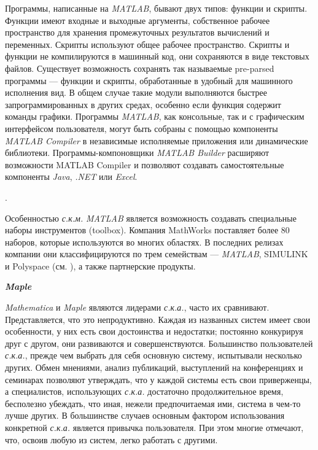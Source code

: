Программы, написанные на \textit{MATLAB}, бывают двух типов: функции и скрипты. Функции имеют входные и выходные аргументы, собственное рабочее пространство для хранения промежуточных результатов вычислений и переменных. Скрипты используют общее рабочее пространство. Скрипты и функции не компилируются в машинный код, они сохраняются в виде текстовых файлов. Существует возможность сохранять так называемые pre-parsed программы --- функции и скрипты, обработанные в удобный для машинного исполнения вид. В общем случае такие модули выполняются быстрее запрограммированных в других средах, особенно если функция содержит команды графики.
Программы \textit{MATLAB}, как консольные, так и с графическим интерфейсом пользователя, могут быть собраны с помощью компоненты \textit{MATLAB Compiler} в независимые исполняемые приложения или динамические библиотеки. Программы-компоновщики \textit{MATLAB Builder} расширяют возможности MATLAB Compiler и позволяют создавать самостоятельные компоненты \textit{Java}, \textit{.NET} или \textit{Excel}.

.

Особенностью \textit{с.к.м.} \textit{MATLAB} является возможность создавать специальные наборы инструментов (toolbox). Компания MathWorks поставляет более 80 наборов, которые используются во многих областях. В последних релизах компании они классифицируются по трем семействам --- \textit{MATLAB}, SIMULINK и Polyspace (см. ), а также партнерские продукты.

\textbf{\textit{Maple}}

\textit{Mathematica} и \textit{Maple} являются лидерами \textit{с.к.а.}, часто их сравнивают. Представляется, что это непродуктивно. Каждая из названных систем имеет свои особенности, у них есть свои достоинства и недостатки; постоянно конкурируя друг с другом, они развиваются и совершенствуются. Большинство пользователей \textit{с.к.а.}, прежде чем выбрать для себя основную систему, испытывали несколько других. Обмен мнениями, анализ публикаций, выступлений на конференциях и семинарах позволяют утверждать, что у каждой системы есть свои приверженцы, а специалистов, использующих \textit{с.к.а.} достаточно продолжительное время, бесполезно убеждать, что иная, нежели предпочитаемая ими, система в чем-то лучше других. В большинстве случаев основным фактором использования конкретной \textit{с.к.а.} является привычка пользователя. При этом многие отмечают, что, освоив любую из систем, легко работать с другими.

